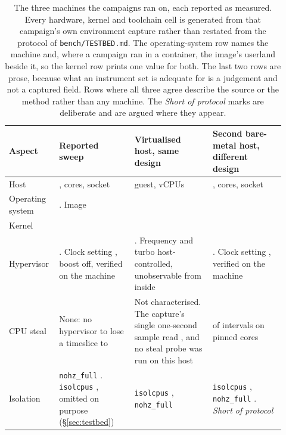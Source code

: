 \documentclass[english,oneside,a4paper,censored,csm,software-track-2020]{HYthesisML}
\begin{document}
\begin{appendices}
\clearpage
\enlargethispage{160pt}
\begin{table}[!ht]
\centering
\small
\caption[The three measurement hosts]{The three machines the campaigns ran on, each reported as
measured. Every hardware, kernel and toolchain cell is generated from that campaign's own
environment capture rather than restated from the protocol of \texttt{bench/TESTBED.md}. The
operating-system row names the machine and, where a campaign ran in a container, the image's
userland beside it, so the kernel row prints one value for both. The last
two rows are prose, because what an instrument set is adequate for is a judgement and not a captured
field. Rows where all three agree describe the source or the method rather than any machine. The
\emph{Short of protocol} marks are deliberate and are argued where they appear.\label{tab:testbed}}
\renewcommand{\arraystretch}{1.0}
\scriptsize
\begin{tabular}{@{}R{0.14\linewidth} R{0.26\linewidth} R{0.27\linewidth} R{0.25\linewidth}@{}}
\hline\hline
Aspect & Reported sweep & Virtualised host, same design & Second bare-metal host, different design \\
\hline
Host & \MainCpu{}, \MainCores{} cores, \MainSockets{} socket & \GuestCpu{} guest, \GuestCores{} vCPUs & \BmCpu{}, \BmCores{} cores, \BmSockets{} socket \\
Operating system & \MainHostDistro{}. Image \MainDistro{} & \GuestDistro{} & \BmDistro{} \\
Kernel & \MainKernel{} & \GuestKernel{} & \BmKernel{} \\
Hypervisor & \MainVirt{}. Clock setting \MainGovernor{}, boost off, verified on the machine & \GuestVirt{}. Frequency and turbo host-controlled, unobservable from inside & \BmVirt{}. Clock setting \BmGovernor{}, verified on the machine \\
CPU steal & None: no hypervisor to lose a timeslice to & Not characterised. The capture's single one-second sample read \GuestSteal{}, and no steal probe was run on this host & \BmStealWithSteal{} of \BmStealIntervals{} intervals on \BmStealCores{} pinned cores \\
Isolation & \texttt{nohz\_full} \MainNohzFull{}. \texttt{isolcpus} \MainIsolcpus{}, omitted on purpose (\S\ref{sec:testbed}) & \texttt{isolcpus} \GuestIsolcpus{}, \texttt{nohz\_full} \GuestNohzFull{} & \texttt{isolcpus} \BmIsolcpus{}, \texttt{nohz\_full} \BmNohzFull{}. \emph{Short of protocol} \\

\end{tabular}
\end{table}
\end{appendices}
\end{document}
